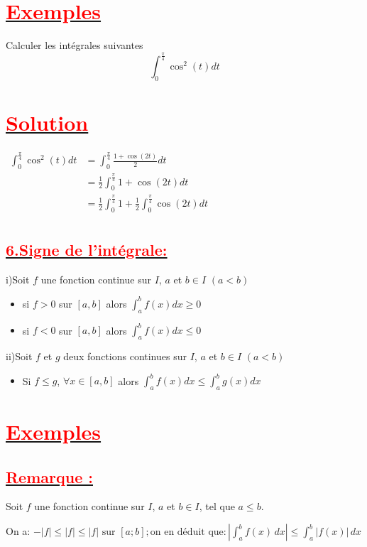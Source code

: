 \documentclass[12pt,a4paper]{article}
\begin{document}
\section*{\underline{\textbf{\textcolor{red}{Exemples}}}}
Calculer les intégrales suivantes
\[ \int_0^{\frac{\pi}{4}}\cos^{2}(t)dt\]
\section*{\underline{\textbf{\textcolor{red}{Solution}}}}
\( 
\begin{aligned} 
\int_0^{\frac{\pi}{4}}\cos^{2}(t)dt &=\int_0^{\frac{\pi}{4}}\frac{1+\cos(2t)}{2}dt \\
&=\frac{1}{2}\int_0^{\frac{\pi}{4}}1+\cos(2t)dt \\
&=\frac{1}{2}\int_0^{\frac{\pi}{4}}1+\frac{1}{2}\int_0^{\frac{\pi}{4}}\cos(2t)dt \\
\end{aligned}
\)
\subsection*{\underline{\textbf{\textcolor{red}{6.Signe de l'intégrale:}}}}
i)Soit $f$ une fonction continue sur $I$, $a$ et $b\in I$  $(a<b)$
\begin{itemize}
\item si $f>0$ sur $[a,b]$ alors $\int_a^b f(x)dx \geq 0$
\item si $f<0$ sur $[a,b]$ alors $\int_a^b f(x)dx \leq 0$
\end{itemize}
ii)Soit $f$ et $g$ deux fonctions continues sur $I$, $a$ et $b\in I$  $(a<b)$
\begin{itemize}
\item Si $f \leq g$, $\forall x \in[a,b]$ alors $ \int_a^b f(x)dx \leq \int_a^b g(x)dx$
\end{itemize}
\section*{\underline{\textbf{\textcolor{red}{Exemples}}}}

\subsection*{\underline{\textbf{\textcolor{red}{Remarque :}}}}

Soit \( f \) une fonction continue sur \( I \), \( a \) et \( b \in I \), tel que \( a \leq b \).

On a: \( -|f| \leq |f| \leq |f| \text{ sur } [a ; b] ; \text{on en déduit que} : \left| \int_a^b f(x) \, dx \right| \leq \int_a^b |f(x)| \, dx\)
\end{document}
